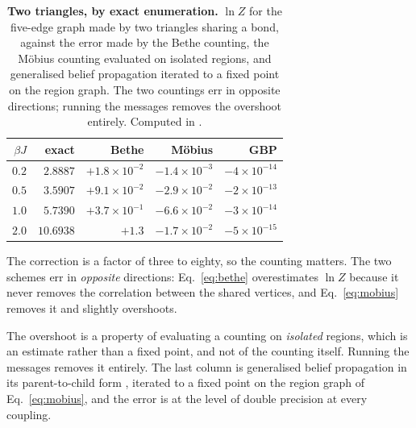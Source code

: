 \begin{table}[t]
\centering\small
\begin{tabular}{rrrrr}
\hline\hline
$\beta J$ & exact & Bethe & M\"obius & GBP\\
\hline
$0.2$ & $2.8887$ & $+1.8\times10^{-2}$ & $-1.4\times10^{-3}$ & $-4\times10^{-14}$\\
$0.5$ & $3.5907$ & $+9.1\times10^{-2}$ & $-2.9\times10^{-2}$ & $-2\times10^{-13}$\\
$1.0$ & $5.7390$ & $+3.7\times10^{-1}$ & $-6.6\times10^{-2}$ & $-3\times10^{-14}$\\
$2.0$ & $10.6938$ & $+1.3$ & $-1.7\times10^{-2}$ & $-5\times10^{-15}$\\
\hline\hline
\end{tabular}
\caption{\textbf{Two triangles, by exact enumeration.} $\ln Z$ for the five-edge graph made by two triangles sharing a bond, against the error made by the Bethe counting, the M\"obius counting evaluated on isolated regions, and generalised belief propagation iterated to a fixed point on the region graph. The two countings err in opposite directions; running the messages removes the overshoot entirely. Computed in .}
\label{tab:twotriangles}
\end{table}

The correction is a factor of three to eighty, so the counting matters. The two
schemes err in \emph{opposite} directions:
Eq.~\eqref{eq:bethe} overestimates $\ln Z$ because it never removes the
correlation between the shared vertices, and Eq.~\eqref{eq:mobius} removes it
and slightly overshoots.

The overshoot is a property of evaluating a counting on \emph{isolated}
regions, which is an estimate rather than a fixed point, and not of the counting
itself. Running the messages removes it entirely. The last column is
generalised belief propagation in its parent-to-child form \citep{yedidia2005},
iterated to a fixed point on the region graph of Eq.~\eqref{eq:mobius}, and the
error is at the level of double precision at every coupling.


